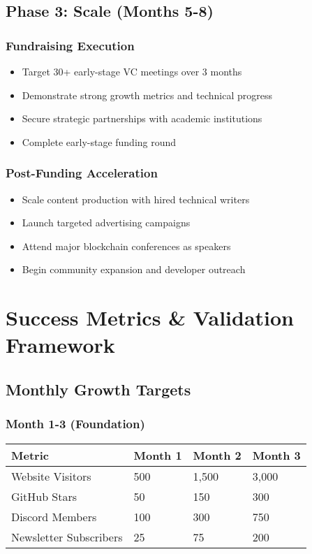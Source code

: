 \documentclass[12pt,a4paper]{article}
\begin{document}
\begin{itemize}
\subsection{Phase 3: Scale (Months 5-8)}

\subsubsection{Fundraising Execution}
\begin{itemize}
    \item Target 30+ early-stage VC meetings over 3 months
    \item Demonstrate strong growth metrics and technical progress  
    \item Secure strategic partnerships with academic institutions
    \item Complete early-stage funding round
\end{itemize}

\subsubsection{Post-Funding Acceleration}  
\begin{itemize}
    \item Scale content production with hired technical writers
    \item Launch targeted advertising campaigns
    \item Attend major blockchain conferences as speakers
    \item Begin community expansion and developer outreach
\end{itemize}

\section{Success Metrics \& Validation Framework}

\subsection{Monthly Growth Targets}

\subsubsection{Month 1-3 (Foundation)}
\begin{center}
\begin{tabular}{|l|l|l|l|}
\hline
\textbf{Metric} & \textbf{Month 1} & \textbf{Month 2} & \textbf{Month 3} \\
\hline
Website Visitors & 500 & 1,500 & 3,000 \\
\hline
GitHub Stars & 50 & 150 & 300 \\
\hline
Discord Members & 100 & 300 & 750 \\
\hline
Newsletter Subscribers & 25 & 75 & 200 \\
\hline
\end{tabular}
\end{center}


\end{itemize}
\end{document}
